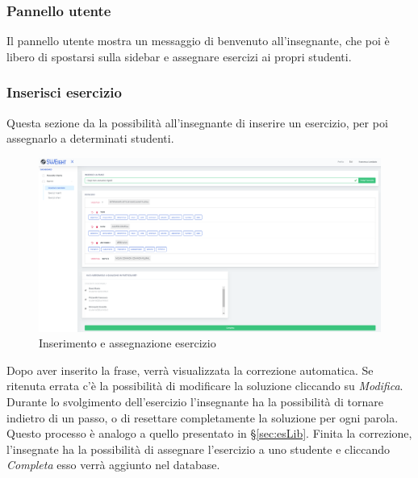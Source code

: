         \subsubsection{Pannello utente}
          Il pannello utente mostra un messaggio di benvenuto all'insegnante, che poi è libero di spostarsi sulla sidebar e assegnare esercizi ai propri studenti.
        
        
        
        
        \subsubsection{Inserisci esercizio}
          Questa sezione da la possibilità all'insegnante di inserire un esercizio, per poi assegnarlo a determinati studenti.
        	\begin{figure}[H]
            	\centering
        		\includegraphics[width=17cm]{sez/img/insegnante/inserisciEsercizio.PNG} 
            	\caption{Inserimento e assegnazione esercizio}\label{fig:1}
        	\end{figure}
        
          Dopo aver inserito la frase, verrà visualizzata la correzione automatica. Se ritenuta errata c'è la possibilità di modificare la soluzione cliccando su \textit{Modifica}. Durante lo svolgimento dell'esercizio l'insegnante ha la possibilità di tornare indietro di un passo, o di resettare completamente la soluzione per ogni parola. Questo processo è analogo a quello presentato in \S\ref{sec:esLib}. Finita la correzione, l'insegnate ha la possibilità di assegnare l'esercizio a uno studente e cliccando \textit{Completa} esso verrà aggiunto nel database.
        
